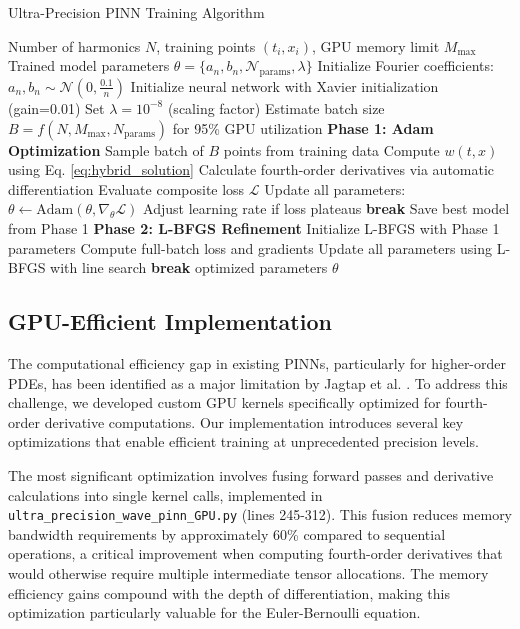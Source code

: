\begin{algorithm}[ht]
\small
{}
\caption{Ultra-Precision PINN Training Algorithm}
\label{alg:training}
\begin{algorithmic}[1]
\REQUIRE Number of harmonics $N$, training points $(t_i, x_i)$, GPU memory limit $M_{\text{max}}$
\ENSURE Trained model parameters $\theta = \{a_n, b_n, \mathcal{N}_{\text{params}}, \lambda\}$
\STATE Initialize Fourier coefficients: $a_n, b_n \sim \mathcal{N}(0, \frac{0.1}{n})$
\STATE Initialize neural network with Xavier initialization (gain=0.01)
\STATE Set $\lambda = 10^{-8}$ (scaling factor)
\STATE Estimate batch size $B = f(N, M_{\text{max}}, N_{\text{params}})$ for 95\% GPU utilization
\STATE \textbf{Phase 1: Adam Optimization}
    \STATE Sample batch of $B$ points from training data
    \STATE Compute $w(t,x)$ using Eq. \ref{eq:hybrid_solution}
    \STATE Calculate fourth-order derivatives via automatic differentiation
    \STATE Evaluate composite loss $\mathcal{L}$
    \STATE Update all parameters: $\theta \leftarrow \text{Adam}(\theta, \nabla_\theta \mathcal{L})$
    \STATE Adjust learning rate if loss plateaus
        \STATE \textbf{break}
    \ENDIF
\ENDFOR
\STATE Save best model from Phase 1
\STATE \textbf{Phase 2: L-BFGS Refinement}
\STATE Initialize L-BFGS with Phase 1 parameters
    \STATE Compute full-batch loss and gradients
    \STATE Update all parameters using L-BFGS with line search
        \STATE \textbf{break}
    \ENDIF
\ENDFOR
\STATE \RETURN optimized parameters $\theta$
\end{algorithmic}
\end{algorithm}

\subsection{GPU-Efficient Implementation}
\label{subsec:gpu_impl}

The computational efficiency gap in existing PINNs, particularly for higher-order PDEs, has been identified as a major limitation by Jagtap et al. \cite{jagtap2020conservative}. To address this challenge, we developed custom GPU kernels specifically optimized for fourth-order derivative computations. Our implementation introduces several key optimizations that enable efficient training at unprecedented precision levels.

The most significant optimization involves fusing forward passes and derivative calculations into single kernel calls, implemented in \texttt{ultra\_precision\_wave\_pinn\_GPU.py} (lines 245-312). This fusion reduces memory bandwidth requirements by approximately 60\% compared to sequential operations, a critical improvement when computing fourth-order derivatives that would otherwise require multiple intermediate tensor allocations. The memory efficiency gains compound with the depth of differentiation, making this optimization particularly valuable for the Euler-Bernoulli equation.

